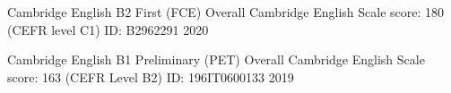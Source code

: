

\begin{cvhonors}

  \cvhonor
    {Cambridge English B2 First (FCE)} %
    {Overall Cambridge English Scale score: 180 (CEFR level C1)} %
    {ID: B2962291} %
    {2020} %

  \cvhonor
    {Cambridge English B1 Preliminary (PET)} %
    {Overall Cambridge English Scale score: 163 (CEFR Level B2)} %
    {ID: 196IT0600133} %
    {2019} %

\end{cvhonors}
